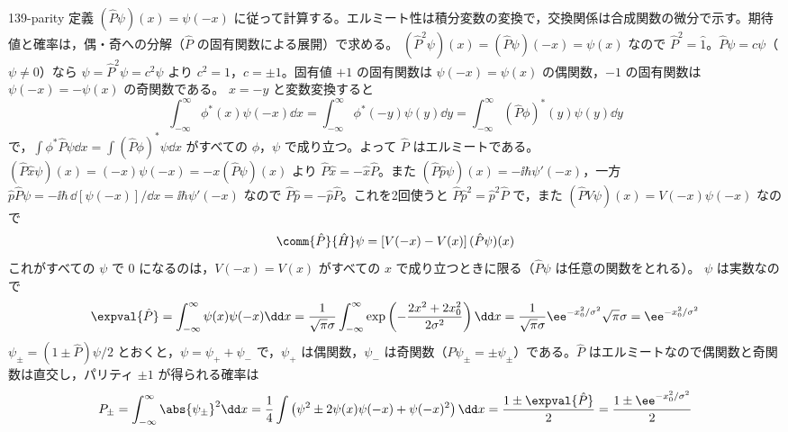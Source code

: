 \documentclass[uplatex,dvipdfmx,a4paper,11pt]{jsarticle}
\begin{document}
\begin{kaisetsu}{139-parity}
\houshin 定義 $(\hat{P}\psi)(x)=\psi(-x)$ に従って計算する。エルミート性は積分変数の変換で，交換関係は合成関数の微分で示す。期待値と確率は，偶・奇への分解（$\hat{P}$ の固有関数による展開）で求める。
\keisan
{} $(\hat{P}^{2}\psi)(x)=(\hat{P}\psi)(-x)=\psi(x)$ なので $\hat{P}^{2}=\hat{1}$。$\hat{P}\psi=c\psi$（$\psi\neq0$）なら $\psi=\hat{P}^{2}\psi=c^{2}\psi$ より $c^{2}=1$，$c=\pm1$。固有値 $+1$ の固有関数は $\psi(-x)=\psi(x)$ の偶関数，$-1$ の固有関数は $\psi(-x)=-\psi(x)$ の奇関数である。
 $x=-y$ と変数変換すると
\[ \int_{-\infty}^{\infty}\phi^{*}(x)\psi(-x)\dd x=\int_{-\infty}^{\infty}\phi^{*}(-y)\psi(y)\dd y=\int_{-\infty}^{\infty}(\hat{P}\phi)^{*}(y)\psi(y)\dd y \]
で，$\int\phi^{*}\hat{P}\psi\dd x=\int(\hat{P}\phi)^{*}\psi\dd x$ がすべての $\phi$，$\psi$ で成り立つ。よって $\hat{P}$ はエルミートである。
 $(\hat{P}\hat{x}\psi)(x)=(-x)\psi(-x)=-x(\hat{P}\psi)(x)$ より $\hat{P}\hat{x}=-\hat{x}\hat{P}$。また $(\hat{P}\hat{p}\psi)(x)=-\ii\hbar\psi'(-x)$，一方 $\hat{p}\hat{P}\psi=-\ii\hbar\,\dd[\psi(-x)]/\dd x=\ii\hbar\psi'(-x)$ なので $\hat{P}\hat{p}=-\hat{p}\hat{P}$。これを2回使うと $\hat{P}\hat{p}^{2}=\hat{p}^{2}\hat{P}$ で，また $(\hat{P}V\psi)(x)=V(-x)\psi(-x)$ なので
\[ \comm{\hat{P}}{\hat{H}}\psi=\left[V(-x)-V(x)\right](\hat{P}\psi)(x) \]
これがすべての $\psi$ で $0$ になるのは，$V(-x)=V(x)$ がすべての $x$ で成り立つときに限る（$\hat{P}\psi$ は任意の関数をとれる）。
 $\psi$ は実数なので
\[ \expval{\hat{P}}=\int_{-\infty}^{\infty}\psi(x)\psi(-x)\dd x=\frac{1}{\sqrt{\pi}\sigma}\int_{-\infty}^{\infty}\exp\left(-\frac{2x^{2}+2x_{0}^{2}}{2\sigma^{2}}\right)\dd x=\frac{1}{\sqrt{\pi}\sigma}\ee^{-x_{0}^{2}/\sigma^{2}}\sqrt{\pi}\sigma=\ee^{-x_{0}^{2}/\sigma^{2}} \]
$\psi_{\pm}=(1\pm\hat{P})\psi/2$ とおくと，$\psi=\psi_{+}+\psi_{-}$ で，$\psi_{+}$ は偶関数，$\psi_{-}$ は奇関数（$\hat{P}\psi_{\pm}=\pm\psi_{\pm}$）である。$\hat{P}$ はエルミートなので偶関数と奇関数は直交し，パリティ $\pm1$ が得られる確率は
\[ P_{\pm}=\int_{-\infty}^{\infty}\abs{\psi_{\pm}}^{2}\dd x=\frac{1}{4}\int\left(\psi^{2}\pm2\psi(x)\psi(-x)+\psi(-x)^{2}\right)\dd x=\frac{1\pm\expval{\hat{P}}}{2}=\frac{1\pm\ee^{-x_{0}^{2}/\sigma^{2}}}{2} \]
\begin{ronten}

\end{ronten}
\end{kaisetsu}
\end{document}
